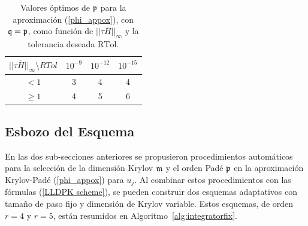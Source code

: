 \begin{table}[htb]
	\caption{Valores óptimos de $\mathfrak{p}$ para la aproximación (\ref{phi_appox}), con $\mathfrak{q}=\mathfrak{p}$, como función de $\lvert\lvert \tau\overline{H} \rvert\rvert_\infty$ y la tolerancia deseada $\mathrm{RTol}$.}
	\begin{center}
		\begin{tabular}{cccc}
			\hline
			$\lvert\lvert \tau\overline{H} \rvert\rvert_\infty \setminus RTol$ & $10^{-9}$ & $10^{-12}$ & $10^{-15}$ \\
			\hline
			$<1$ & 3 & 4 & 4 \\
			$\geq 1$ & 4 & 5 & 6 \\
			\hline
		\end{tabular}
		\label{table:padep}
	\end{center}
\end{table}

\subsection{Esbozo del Esquema}

En las dos sub-secciones anteriores se propusieron procedimientos automáticos para la selección de la dimensión Krylov $\mathfrak{m}$ y el orden Padé $\mathfrak{p}$ en la aproximación Krylov-Padé (\ref{phi_appox}) para $u_j$. Al combinar estos procedimientos con las fórmulas (\ref{LLDPK scheme}), se pueden construir dos esquemas adaptativos con tamaño de paso fijo y dimensión de Krylov variable. Estos esquemas, de orden $r=4$ y $r=5$, están resumidos en Algoritmo~\ref{alg:integratorfix}.

